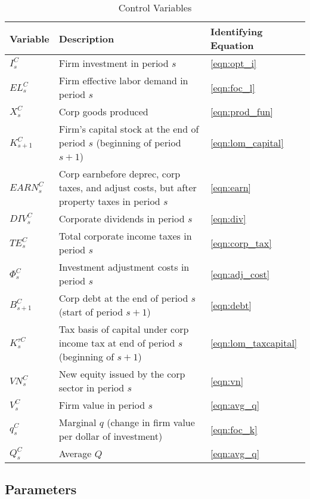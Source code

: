 \begin{table}[htbp]
  \centering
  \caption{Control Variables}
    \begin{tabular}{lll}
    \hline
    \hline
    Variable & Description & Identifying Equation \\
    \hline
    $I^{C}_{s}$ & Firm investment in period $s$ & \ref{eqn:opt_i} \\
    $EL^{C}_{s}$ & Firm effective labor demand in period $s$ & \ref{eqn:foc_l} \\
    $X^{C}_{s}$ & Corp goods produced & \ref{eqn:prod_fun} \\
    $K^{C}_{s+1}$ & Firm's capital stock at the end of period $s$ (beginning of period $s+1$) & \ref{eqn:lom_capital} \\
    $EARN^{C}_{s}$ & Corp earnbefore deprec, corp taxes, and adjust costs, but after property taxes in period $s$ & \ref{eqn:earn} \\
    $DIV^{C}_{s}$ & Corporate dividends in period $s$ & \ref{eqn:div} \\
    $TE^{C}_{s}$ & Total corporate income taxes in period $s$ & \ref{eqn:corp_tax} \\
    $\Phi^{C}_{s}$ & Investment adjustment costs in period $s$ & \ref{eqn:adj_cost} \\
    $B^{C}_{s+1}$ & Corp debt at the end of period $s$ (start of period $s+1$) & \ref{eqn:debt} \\
    $K^{\tau C}_{s}$ & Tax basis of capital under corp income tax at end of period $s$ (beginning of $s+1$) & \ref{eqn:lom_taxcapital} \\
    $VN^{C}_{s}$ & New equity issued by the corp sector in period $s$ & \ref{eqn:vn} \\
    $V^{C}_{s}$ & Firm value in period $s$ & \ref{eqn:avg_q} \\
    $q^{C}_{s}$ & Marginal $q$ (change in firm value per dollar of investment) & \ref{eqn:foc_k} \\
    $Q^{C}_{s}$ & Average $Q$ & \ref{eqn:avg_q} \\
    \hline
    \hline
    \end{tabular}%
  \label{tab:control_vars}%
\end{table}%


\subsection{Parameters}

